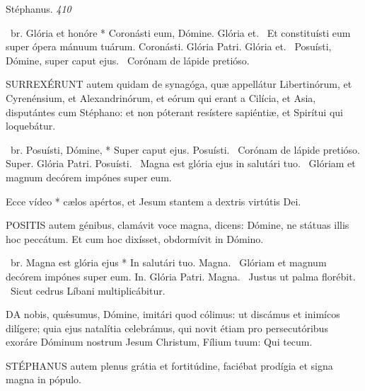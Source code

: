 
 Stéphanus. \textit{410}

\R\ br. Glória et honóre * Coronásti eum, Dómine. Glória et. \V\ Et constituísti eum super ópera mánuum tuárum. Coronásti. Glória Patri. Glória et. \V\ Posuísti, Dómine, super caput ejus. \R\ Corónam de lápide pretióso.



\lettrine[lines=2]{S}{URREXÉRUNT} autem quidam de synagóga, quæ appellátur Libertinórum, et Cyrenénsium, et Alexandrinórum, et eórum qui erant a Cilícia, et Asia, disputántes cum Stéphano: et non póterant resístere sapiéntiæ, et Spirítui qui loquebátur.

\R\ br. Posuísti, Dómine, * Super caput ejus. Posuísti. \V\ Corónam de lápide pretióso. Super. Glória Patri. Posuísti. \V\ Magna est glória ejus in salutári tuo. \R\ Glóriam et magnum decórem impónes super eum.


 Ecce vídeo * cælos apértos, et Jesum stantem a dextris virtútis Dei.


\lettrine[lines=2]{P}{OSITIS} autem génibus, clamávit voce magna, dicens: Dómine, ne státuas illis hoc peccátum. Et cum hoc dixísset, obdormívit in Dómino.

\R\ br. Magna est glória ejus * In salutári tuo. Magna. \V\ Glóriam et magnum decórem impónes super eum. In. Glória Patri. Magna. \V\ Justus ut palma florébit. \R\ Sicut cedrus Líbani multiplicábitur.


\lettrine[lines=2]{D}{A} nobis, quǽsumus, Dómine, imitári quod cólimus: ut discámus et inimícos dilígere; quia ejus natalítia celebrámus, qui novit étiam pro persecutóribus exoráre Dóminum nostrum Jesum Christum, Fílium tuum: Qui tecum.




\lettrine[lines=2]{S}{TÉPHANUS} autem plenus grátia et fortitúdine, faciébat prodígia et signa magna in pópulo.


